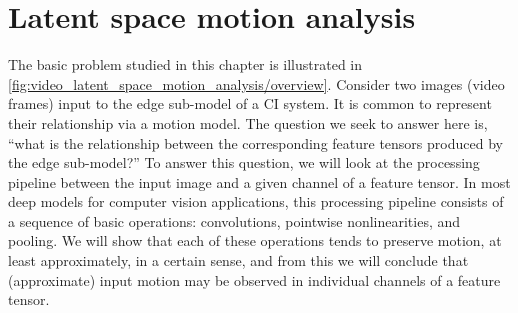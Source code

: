 













\section{Latent space motion analysis}
\label{sec:video_latent_space_motion_analysis/motion_analysis}

The basic problem studied in this chapter is illustrated in \cref{fig:video_latent_space_motion_analysis/overview}. Consider two images (video frames) input to the edge sub-model of a CI system. It is common to represent their relationship via a motion model. The question we seek to answer here is, ``what is the relationship between the corresponding feature tensors produced by the edge sub-model?'' To answer this question, we will look at the processing pipeline between the input image and a given channel of a feature tensor. In most deep models for computer vision applications, this processing pipeline consists of a sequence of basic operations: convolutions, pointwise nonlinearities, and pooling.  We will show that each of these operations tends to preserve motion, at least approximately, in a certain sense, and from this we will conclude that (approximate) input motion may be observed in individual channels of a feature tensor.

